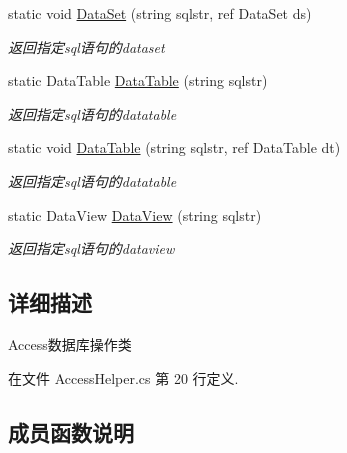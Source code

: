 \begin{DoxyCompactItemize}
static void \hyperlink{class_x_c_l_net_tools_1_1_data_base_1_1_access_1_1_access_helper_aa66ad22b5bfc24c630e34a62a085995f}{Data\+Set} (string sqlstr, ref Data\+Set ds)
\begin{DoxyCompactList}\small\item\em 返回指定sql语句的dataset \end{DoxyCompactList}\item 
static Data\+Table \hyperlink{class_x_c_l_net_tools_1_1_data_base_1_1_access_1_1_access_helper_aec0d16c3a29668e1298500b0f87d0f6e}{Data\+Table} (string sqlstr)
\begin{DoxyCompactList}\small\item\em 返回指定sql语句的datatable \end{DoxyCompactList}\item 
static void \hyperlink{class_x_c_l_net_tools_1_1_data_base_1_1_access_1_1_access_helper_a4ee3cbd4a9212d6df954c2228c2ff2f4}{Data\+Table} (string sqlstr, ref Data\+Table dt)
\begin{DoxyCompactList}\small\item\em 返回指定sql语句的datatable \end{DoxyCompactList}\item 
static Data\+View \hyperlink{class_x_c_l_net_tools_1_1_data_base_1_1_access_1_1_access_helper_a3979a6d17790d9ecc1cc9c4bcf56de84}{Data\+View} (string sqlstr)
\begin{DoxyCompactList}\small\item\em 返回指定sql语句的dataview \end{DoxyCompactList}\end{DoxyCompactItemize}


\subsection{详细描述}
Access数据库操作类 



在文件 Access\+Helper.\+cs 第 20 行定义.



\subsection{成员函数说明}
\mbox{\label{class_x_c_l_net_tools_1_1_data_base_1_1_access_1_1_access_helper_ac0a538c45b918a7f8d2f3e2f5a7eab30}} 
